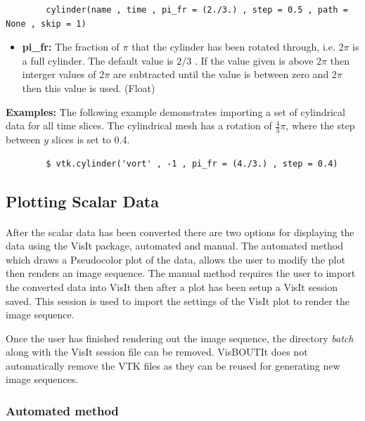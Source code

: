 \documentclass[12pt,a4paper]{article}
\begin{document}
	\begin{verbatim}
		cylinder(name , time , pi_fr = (2./3.) , step = 0.5 , path = None , skip = 1)
	\end{verbatim}
	
	\begin{itemize}
		\item{\textbf{pi\_fr:}
			The fraction of $\pi$ that the cylinder has been rotated through, i.e. 2$\pi$ is a full cylinder. The default value is $2/3$ . If the value given is above 2$\pi$ then interger values of 2$\pi$ are subtracted until the value is between zero and 2$\pi$ then this value is used. (Float)}
	\end{itemize}
		
	\textbf{Examples:} The following example demonstrates importing a set of cylindrical data for all time slices. The cylindrical mesh has a rotation of $\frac{4}{3} \pi$, where the step between $y$ slices is set to 0.4.
	
	\begin{verbatim}
		$ vtk.cylinder('vort' , -1 , pi_fr = (4./3.) , step = 0.4)
	\end{verbatim}
	\paragraph{}
	
	
	\subsection{Plotting Scalar Data}
	\paragraph{}
	After the scalar data has been converted there are two options for displaying the data using the VisIt package, automated and manual. The automated method which draws a Pseudocolor plot of the data, allows the user to modify the plot then renders an image sequence. The manual method requires the user to import the converted data into VisIt then after a plot has been setup a VisIt session saved. This session is used to import the settings of the VisIt plot to render the image sequence.
	
	Once the user has finished rendering out the image sequence, the directory \textit{batch} along with the VisIt session file can be removed. VisBOUTIt does not automatically remove the VTK files as they can be reused for generating new image sequences.
	
	\subsubsection{Automated method}
\end{document}
